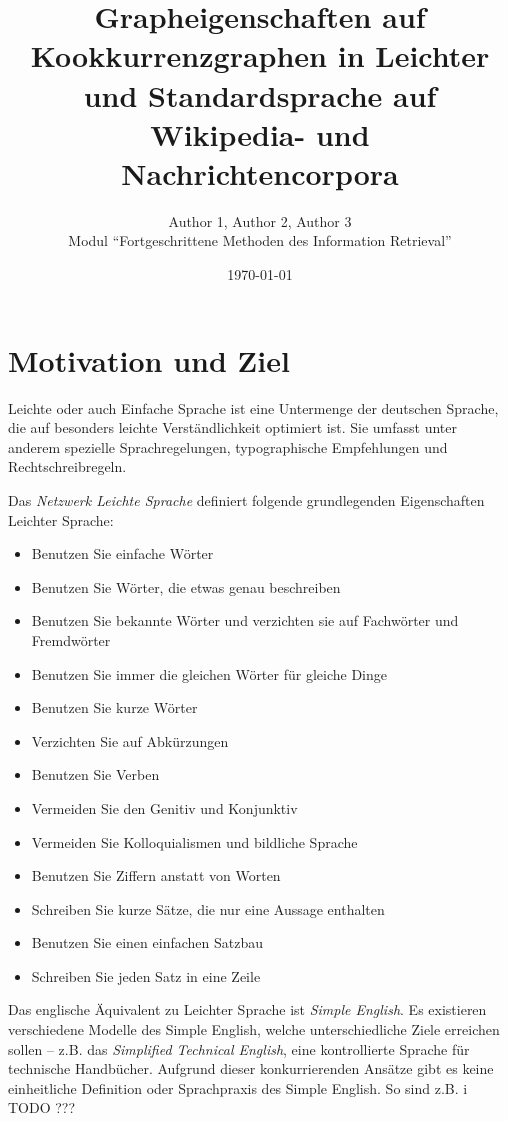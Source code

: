\documentclass[12pt, a4paper]{article}
\title{Grapheigenschaften auf Kookkurrenzgraphen in Leichter und Standardsprache auf Wikipedia- und Nachrichtencorpora}
\author{Author 1, Author 2, Author 3\\Modul "`Fortgeschrittene Methoden des Information Retrieval"'}
\date{\today}
\begin{document}
\maketitle
\tableofcontents

\section{Motivation und Ziel}

Leichte oder auch Einfache Sprache ist eine Untermenge der deutschen Sprache,
die auf besonders leichte Verst\"andlichkeit optimiert ist. Sie umfasst unter
anderem spezielle Sprachregelungen, typographische Empfehlungen und
Rechtschreibregeln. 

Das \emph{Netzwerk Leichte Sprache} definiert folgende grundlegenden
Eigenschaften Leichter Sprache:

\begin{itemize}
	\item Benutzen Sie einfache W\"orter
	\item Benutzen Sie W\"orter, die etwas genau beschreiben
	\item Benutzen Sie bekannte W\"orter und verzichten sie auf Fachw\"orter und Fremdw\"orter
	\item Benutzen Sie immer die gleichen W\"orter f\"ur gleiche Dinge
	\item Benutzen Sie kurze W\"orter
	\item Verzichten Sie auf Abk\"urzungen
	\item Benutzen Sie Verben
	\item Vermeiden Sie den Genitiv und Konjunktiv
	\item Vermeiden Sie Kolloquialismen und bildliche Sprache
	\item Benutzen Sie Ziffern anstatt von Worten
	\item Schreiben Sie kurze S\"atze, die nur eine Aussage enthalten
	\item Benutzen Sie einen einfachen Satzbau
	\item Schreiben Sie jeden Satz in eine Zeile
\end{itemize}

Das englische \"Aquivalent zu Leichter Sprache ist \emph{Simple English}. Es
existieren verschiedene Modelle des Simple English, welche unterschiedliche
Ziele erreichen sollen -- z.B. das \emph{Simplified Technical English}, eine
kontrollierte Sprache f\"ur technische Handb\"ucher. Aufgrund dieser
konkurrierenden Ans\"atze gibt es keine einheitliche Definition oder
Sprachpraxis des Simple English. So sind z.B. i TODO ???
\end{document}
